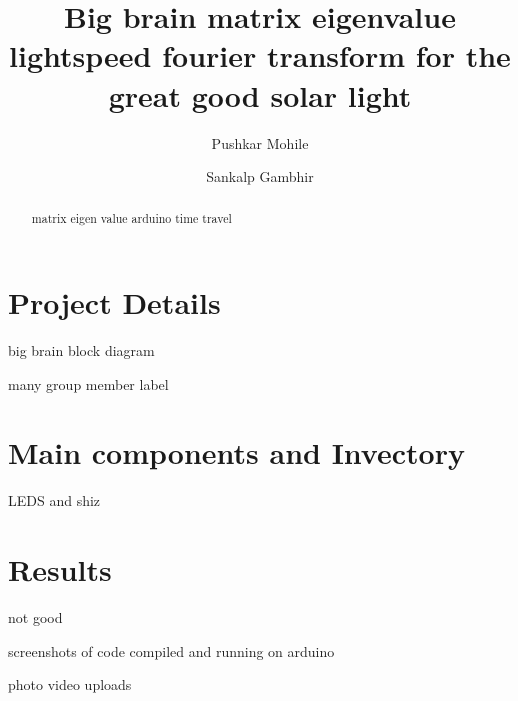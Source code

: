 \documentclass{llncs}
\title{Big brain matrix eigenvalue lightspeed fourier transform for the great good solar light }
\author{Pushkar Mohile \and Sankalp Gambhir}
\begin{document}
\maketitle

\begin{abstract}
matrix eigen value arduino time travel
\end{abstract}

\section{Project Details}
 big brain block diagram

 many group member label

\section{Main components and Invectory}
 LEDS and shiz

\section{Results}
 not good

 screenshots of code compiled and running on arduino
 
 photo video uploads
\end{document}
